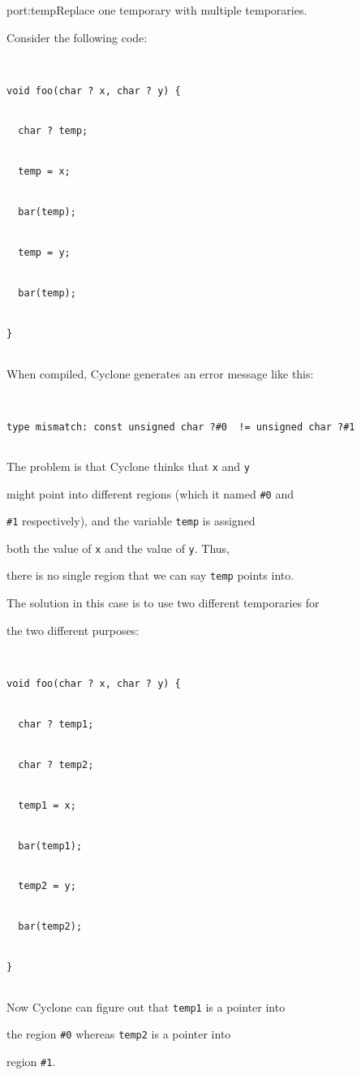 \begin{porta}{port:temp}{Replace one temporary with multiple temporaries.}





Consider the following code:


\begin{verbatim}


void foo(char ? x, char ? y) {


  char ? temp;


  temp = x;


  bar(temp);


  temp = y;


  bar(temp);


}


\end{verbatim}


When compiled, Cyclone generates an error message like this:


\begin{verbatim}


type mismatch: const unsigned char ?#0  != unsigned char ?#1 


\end{verbatim}


The problem is that Cyclone thinks that \texttt{x} and \texttt{y}


might point into different regions (which it named \texttt{\#0} and


\texttt{\#1} respectively), and the variable \texttt{temp} is assigned


both the value of \texttt{x} and the value of \texttt{y}.  Thus,


there is no single region that we can say \texttt{temp} points into.


The solution in this case is to use two different temporaries for


the two different purposes:


\begin{verbatim}


void foo(char ? x, char ? y) {


  char ? temp1;


  char ? temp2;


  temp1 = x;


  bar(temp1);


  temp2 = y;


  bar(temp2);


}


\end{verbatim}


Now Cyclone can figure out that \texttt{temp1} is a pointer into


the region \texttt{\#0} whereas \texttt{temp2} is a pointer into


region \texttt{\#1}.  


\end{porta}





